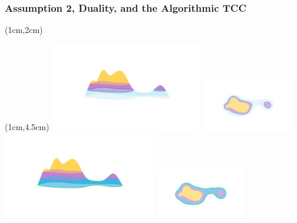 \begin{frame}
  \frametitle{{\small Assumption 2, Duality, and the Algorithmic TCC}}

  \begin{textblock*}{11cm}(1cm,2cm)
    \begin{small}

    \end{small}
  \end{textblock*}

  \begin{textblock*}{12cm}(1cm,4.5cm)
    \includegraphics[trim=200 300 200 200, clip, width=0.5\textwidth]{../scripts/figures/surf/ass2_C_side.png}
    \includegraphics[trim=300 200 200 200, clip, width=0.3\textwidth]{../scripts/figures/surf/ass2_C_top.png}
    \includegraphics[trim=200 300 200 200, clip, width=0.5\textwidth]{../scripts/figures/surf/ass2_B_side.png}
    \includegraphics[trim=300 200 200 200, clip, width=0.3\textwidth]{../scripts/figures/surf/ass2_B_top.png}
  \end{textblock*}
\end{frame}


